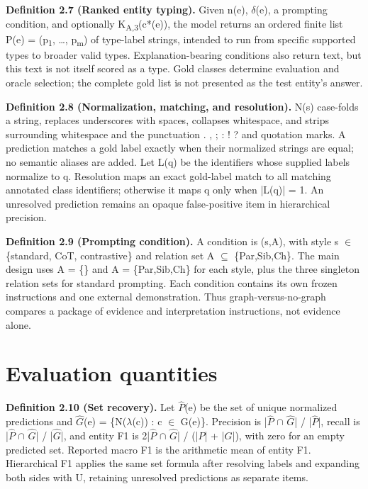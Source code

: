 {\small \textbf{Definition 2.7 (Ranked entity typing).} Given n(e), \ensuremath{\delta}(e), a prompting condition, and optionally K\textsubscript{A,3}(c*(e)), the model returns an ordered finite list P(e) = (p\textsubscript{1}, …, p\textsubscript{m}) of type-label strings, intended to run from specific supported types to broader valid types. Explanation-bearing conditions also return text, but this text is not itself scored as a type. Gold classes determine evaluation and oracle selection; the complete gold list is not presented as the test entity’s answer.\par}


{\small \textbf{Definition 2.8 (Normalization, matching, and resolution).} N(s) case-folds a string, replaces underscores with spaces, collapses whitespace, and strips surrounding whitespace and the punctuation . , ; : ! ? and quotation marks. A prediction matches a gold label exactly when their normalized strings are equal; no semantic aliases are added. Let L(q) be the identifiers whose supplied labels normalize to q. Resolution maps an exact gold-label match to all matching annotated class identifiers; otherwise it maps q only when |L(q)| = 1. An unresolved prediction remains an opaque false-positive item in hierarchical precision.\par}


{\small \textbf{Definition 2.9 (Prompting condition).} A condition is (s,A), with style s \ensuremath{\in} \{standard, CoT, contrastive\} and relation set A \ensuremath{\subseteq} \{Par,Sib,Ch\}. The main design uses A = \{\} and A = \{Par,Sib,Ch\} for each style, plus the three singleton relation sets for standard prompting. Each condition contains its own frozen instructions and one external demonstration. Thus graph-versus-no-graph compares a package of evidence and interpretation instructions, not evidence alone.\par}


\FloatBarrier

\section{Evaluation quantities}

{\small \textbf{Definition 2.10 (Set recovery).} Let \ensuremath{\hat{P}}(e) be the set of unique normalized predictions and \ensuremath{\hat{G}}(e) = \{N(\ensuremath{\lambda}(c)) : c \ensuremath{\in} G(e)\}. Precision is |\ensuremath{\hat{P}} \ensuremath{\cap} \ensuremath{\hat{G}}| / |\ensuremath{\hat{P}}|, recall is |\ensuremath{\hat{P}} \ensuremath{\cap} \ensuremath{\hat{G}}| / |\ensuremath{\hat{G}}|, and entity F1 is 2|\ensuremath{\hat{P}} \ensuremath{\cap} \ensuremath{\hat{G}}| / (|\ensuremath{\hat{P}}| + |\ensuremath{\hat{G}}|), with zero for an empty predicted set. Reported macro F1 is the arithmetic mean of entity F1. Hierarchical F1 applies the same set formula after resolving labels and expanding both sides with U, retaining unresolved predictions as separate items.\par}


